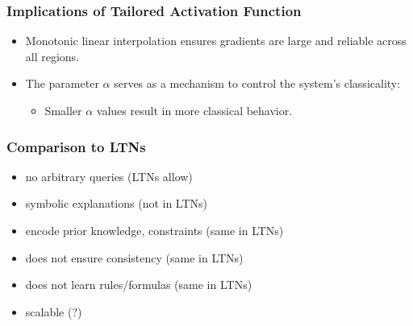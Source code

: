 \documentclass{beamer}
\begin{document}
\begin{frame}
\frametitle{Implications of Tailored Activation Function}
\begin{itemize}
    \item Monotonic linear interpolation ensures gradients are large
      and reliable across all regions.
    \item The parameter \(\alpha\) serves as a mechanism to control
      the system's classicality:
    \begin{itemize}
    \item Smaller \(\alpha\) values result in more classical behavior.
    \end{itemize}
\end{itemize}
\end{frame}

\begin{frame}
  \frametitle{Comparison to LTNs}
  \begin{itemize}
  \item no arbitrary queries (LTNs allow)
  \item symbolic explanations (not in LTNs)
  \item encode prior knowledge, constraints (same in LTNs)
  \item does not ensure consistency (same in LTNs)
  \item does not learn rules/formulas (same in LTNs)
  \item scalable (?)
  \end{itemize}
\end{frame}
\end{document}

